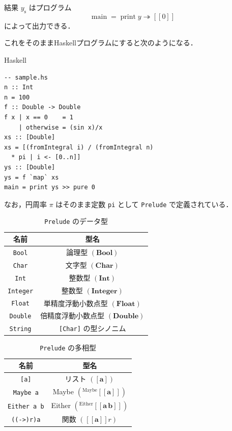 \documentclass[a5paper,twoside,fleqn,draft]{jsbook}
\def\[{[\![}
\def\]{]\!]}
\newcommand{\programminglanguage}[1]{\textsf{#1}}
\newcommand{\haskell}{\programminglanguage{Haskell}}
\newcommand{\code}[1]{\texttt{#1}}
\newcommand{\filename}[1]{\texttt{#1}}
\newenvironment{haskellcode}{\begin{itembox}[r]{\haskell}}{\end{itembox}}
\newcommand{\mAction}[1]{\mathrm{#1}}
\DeclareMathOperator{\mMain}{\mAction{main}}
\DeclareMathOperator{\mPrint}{\mAction{print}}
\DeclareMathOperator{\mBindRightIgnore}{\twoheadrightarrow}
\newcommand{\mType}[1]{\mathbf{#1}} %
\newcommand{\mA}{\mType{a}}
\newcommand{\mBoolType}{\mType{Bool}}
\newcommand{\mCharType}{\mType{Char}}
\newcommand{\mFloatType}{\mType{Float}}
\newcommand{\mDoubleType}{\mType{Double}}
\newcommand{\mIntType}{\mType{Int}}
\newcommand{\mIntegerType}{\mType{Integer}}
\newcommand{\mTypeAssemble}[2]{{}^\mathrm{#1}\[\mType{#2}\]}
\newcommand{\mTypeAssembleII}[3]{{}^\mathrm{#1}\[\mType{#2}\,\mType{#3}\]}
\newcommand{\mEitherType}[2]{\mTypeAssembleII{Either}{#1}{#2}}
\newcommand{\mMaybeType}[1]{\mTypeAssemble{Maybe}{#1}}
\DeclareMathOperator{\mFuncTypeConstructor}{((\rightarrow)\mType{r})}
\newcommand{\mFuncType}[1]{\mTypeAssemble{\mFuncTypeConstructor}{#1}}
\newcommand{\mPureWith}[1]{\[#1\]}
\newcommand{\mList}[1]{{#1}_\mathrm{s}}
\begin{document}
結果 $\mList{y}$ はプログラム
\begin{equation}
\mMain=\mPrint y\mBindRightIgnore\mPureWith{0}
\end{equation}
によって出力できる．

これをそのまま\haskell プログラムにすると次のようになる．
\begin{haskellcode}
\begin{verbatim}
-- sample.hs
n :: Int
n = 100
f :: Double -> Double
f x | x == 0    = 1
    | otherwise = (sin x)/x
xs :: [Double]
xs = [(fromIntegral i) / (fromIntegral n)
  * pi | i <- [0..n]]
ys :: [Double]
ys = f `map` xs
main = print ys >> pure 0
\end{verbatim}
\end{haskellcode}

なお，円周率 $\pi$ はそのまま定数 \code{pi} として \filename{Prelude}
で定義されている．

\begin{table}
\caption{\filename{Prelude} のデータ型}
\label{tab:data-types}
\begin{center}
\begin{tabular}{||c|c||}
\hline
名前&型名\\
\hline\hline
\code{Bool}&論理型 $(\mBoolType)$\\
\code{Char}&文字型 $(\mCharType)$\\
\code{Int}&整数型 $(\mIntType)$\\
\code{Integer}&整数型 $(\mIntegerType)$\\
\code{Float}&単精度浮動小数点型 $(\mFloatType)$\\
\code{Double}&倍精度浮動小数点型 $(\mDoubleType)$\\
\code{String}&\code{[Char]} の型シノニム\\
\hline
\end{tabular}
\end{center}
\end{table}

\begin{table}
\caption{\filename{Prelude} の多相型}
\label{tab:data-types-polymorphic}
\begin{center}
\begin{tabular}{||c|c||}
\hline
名前&型名\\
\hline\hline
\code{[a]}&リスト $([\mA])$\\
\code{Maybe a}&Maybe $\left(\mMaybeType{a}\right)$\\
\code{Either a b}&Either $\left(\mEitherType{a}{b}\right)$\\
\code{((->)r)a}&関数 $\left(\mFuncType{a}{r}\right)$\\
\hline
\end{tabular}
\end{center}
\end{table}
\end{document}
